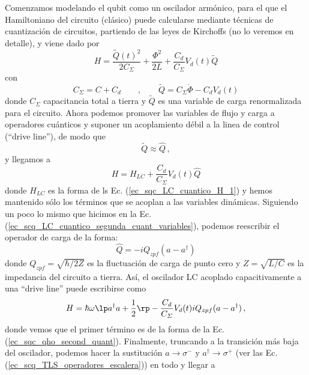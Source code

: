         Comenzamos modelando el qubit como un oscilador armónico, para el que el Hamiltoniano del circuito (clásico) puede calcularse mediante técnicas de cuantización de circuitos, partiendo de las leyes de Kirchoffs (no lo veremos en detalle), y viene dado por
        \begin{equation}
            H = \frac{\tilde{Q}(t)^2}{2 C_\varSigma} + \frac{\Phi^2}{2L} + \frac{C_d}{C_\varSigma} V_d(t) \tilde{Q}
        \end{equation}
        con 
        \begin{equation}
            C_{\varSigma} = C + C_d 
            \qquad , \qquad
            \tilde{Q} = C_\varSigma \dot{\Phi} - C_d V_d(t)
        \end{equation}
        donde $C_\varSigma$  capacitancia total a tierra y $\tilde{Q}$ es una variable de carga renormalizada para el circuito. Ahora podemos promover las variables de flujo y carga a operadores cuánticos y suponer un acoplamiento débil a la linea de control (``drive line''), de modo que
        \begin{equation}
            \tilde{Q} \approx \hat{Q}\,,
        \end{equation}
        y llegamos a
        \begin{equation}
            H = H_{LC} + \frac{C_d}{C_\varSigma} V_d(t) \hat{Q}
        \end{equation}
        donde $H_{LC}$ es la forma de ls Ec. (\ref{ec_sqc_LC_cuantico_H_1}) y hemos mantenido sólo los términos que se acoplan a las variables dinámicas. Siguiendo un poco lo mismo que hicimos en la Ec. (\ref{ec_scq_LC_cuantico_segunda_cuant_variables}), podemos reescribir el operador de carga de la forma:
        \begin{equation}
            \hat{Q} = -i Q_{zpf} (a - a^\dagger)
        \end{equation}
        donde $Q_{zpf} = \sqrt{\hbar/2Z}$ es la fluctuación de carga de punto cero y $Z=\sqrt{L/C}$ es la impedancia del circuito a tierra. Así, el oscilador LC acoplado capacitivamente a una ``drive line'' puede escribirse como
        \begin{equation} \label{ec_scq_drive_no_TLS}
            H = \hbar \omega \lp a^\dagger a + \frac{1}{2} \rp - \frac{C_d}{C_\varSigma} V_d(t) i Q_{zpf} (a-a^\dagger)\, ,
        \end{equation}
        donde vemos que el primer término es de la forma de la Ec. (\ref{ec_sqc_qho_second_quant}). Finalmente, truncando a la transición más baja del oscilador, podemos hacer la sustitución $a \rightarrow \sigma^{-}$ y $a^\dagger \rightarrow \sigma^{+}$ (ver las Ec. (\ref{ec_scq_TLS_operadores_escalera})) en todo y llegar a
